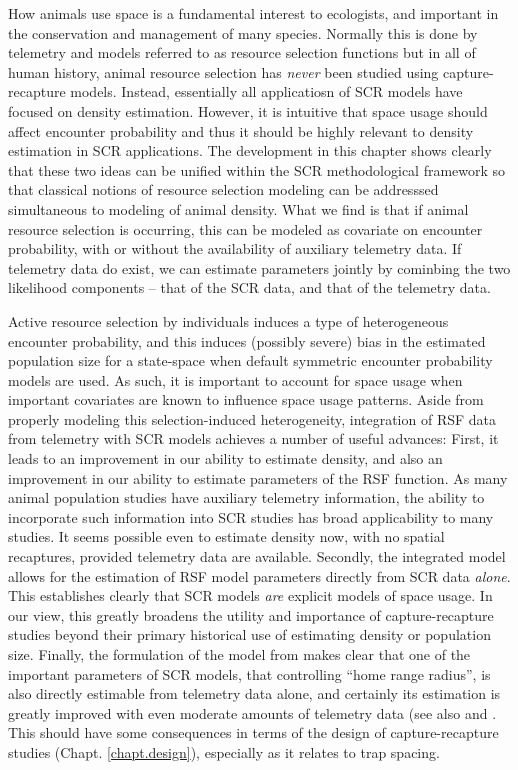 How animals use space is a fundamental interest to ecologists, and
important in the conservation and management of many species.
Normally this is done by telemetry and models referred to as resource
selection functions \citep{manly_etal:2002} but in all of human
history, animal resource selection has {\it never} been studied using
capture-recapture models. Instead, essentially all applicatiosn of SCR
models have focused on density estimation.  However, it is intuitive
that space usage should affect encounter probability and thus it
should be highly relevant to density estimation in SCR
applications. The development in this chapter shows clearly that these
two ideas can be unified within the SCR methodological framework so
that classical notions of resource selection modeling can be
addresssed simultaneous to modeling of animal density. What we find is
that if animal resource selection is occurring, this can be modeled as
covariate on encounter probability, with or without the availability
of auxiliary telemetry data. If telemetry data do exist, we can
estimate parameters jointly by cominbing the two likelihood components
-- that of the SCR data, and that of the telemetry data.



Active resource selection by individuals  
induces a type of heterogeneous encounter probability, and this
induces (possibly severe) bias in the estimated population size for a
state-space when default symmetric
encounter probability models are used.
As such, it is important to account for space usage when important
covariates are known to influence space usage patterns.
Aside from properly modeling this selection-induced heterogeneity, integration of RSF data from telemetry with SCR models achieves a
number of useful advances:
First, it
leads to an improvement in our ability to estimate density,
and also an improvement in our ability to estimate parameters of the
RSF function.  As many animal population studies have auxiliary
telemetry information, the ability to incorporate such information
into SCR studies has broad applicability to many studies.  It seems
possible even to estimate density now, with no spatial recaptures,
provided telemetry data are available.  
Secondly, 
the integrated model
allows for the estimation of RSF model parameters directly from SCR
data {\it alone}.  This establishes clearly that SCR models {\it are}
explicit models of space usage. In our view, this greatly broadens the
utility and importance of capture-recapture studies beyond their
primary historical use of estimating density or population
size. Finally, the formulation of the model from \citet{royle_etal:2012mee}
makes clear that one of the important parameters of SCR
models, that controlling ``home range radius'', is also directly
estimable from telemetry data alone, and certainly its estimation is
greatly improved with even moderate amounts of telemetry data (see
also \citet{sollmann_etal:2012ecol} and \citet{sollmann_etal:inprepjapplecol}. 
This should have some consequences in terms of the design of capture-recapture
studies (Chapt. \ref{chapt.design}), especially as it relates to trap spacing.

